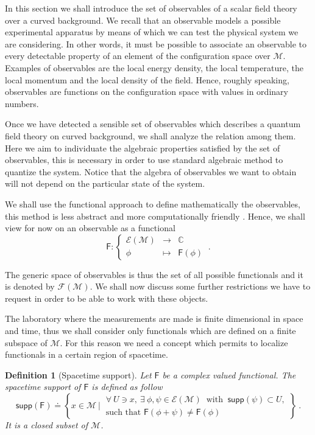 \documentclass[11pt]{book}
\newcommand{\supp}{\mathsf{supp}}
\newcommand{\Ecal}{\mathcal{E}}
\newcommand{\Fcal}{\mathcal{F}}
\newcommand{\Mcal}{\mathcal{M}}
\newcommand{\Cbb}{\mathbb{C}}
\newcommand{\Fsf}{\mathsf{F}}
\theoremstyle{break}
\newtheorem{definition}{Definition}[chapter]
\begin{document}
In this section we shall introduce the set of observables of a scalar field theory over a curved background. We recall that an observable models a possible experimental apparatus by means of which we can test the physical system we are considering. In other words, it must be possible to associate an observable to every detectable property of an element of the configuration space over $\Mcal$. Examples of observables are the local energy density, the local temperature, the local momentum and the local density of the field.  Hence, roughly speaking, observables are functions on the configuration space with values in ordinary numbers.


Once we have detected a sensible set of observables which describes a quantum field theory on curved background, we shall analyze the relation among them. Here we aim to individuate the algebraic properties satisfied by the set of observables, this is necessary in order to use standard algebraic method to quantize the system. Notice that the algebra of observables we want to obtain will not depend on the particular state of the system.


We shall use the functional approach to define mathematically the observables, this method is less abstract and more computationally friendly \cite{brunetti_algebraic_2012,brunetti_perturbative_2009}. Hence, we shall view for now on an observable as a functional 
%
\begin{equation*}
\Fsf : \left\{
\begin{array}{ccc}
\Ecal(\Mcal) & \to     & \Cbb \\
\phi  & \mapsto & \Fsf(\phi)
\end{array}
\right. \ . 
\end{equation*}


The generic space of observables is thus the set of all possible functionals and it is denoted by $\Fcal(\Mcal)$. We shall now discuss some further restrictions we have to request in order to be able to work with these objects.


The laboratory where the measurements are made is finite dimensional in space and time, thus we shall consider only functionals which are defined on a finite subspace of $\Mcal$. For this reason we need a concept which permits to localize functionals in a certain region of spacetime.


\begin{definition}[Spacetime support] \label{def:spacetime_supp}
Let $\Fsf$ be a complex valued functional. The spacetime support of $\Fsf$ is defined as follow
%
\begin{equation*}
\supp(\Fsf) \doteq \left\{ x \in \Mcal \ \bigg| \ 
\begin{array}{l}
\forall \ U \ni x , \ \exists \ \phi, \psi \in \Ecal(\Mcal) \ \mbox{ with } \ \supp(\psi) \subset U, \\
\mbox{such that } \Fsf(\phi + \psi) \neq \Fsf(\phi)
\end{array}
\right\} \ .
\end{equation*}
It is a closed subset of $\Mcal$.
%
\end{definition}
\end{document}
